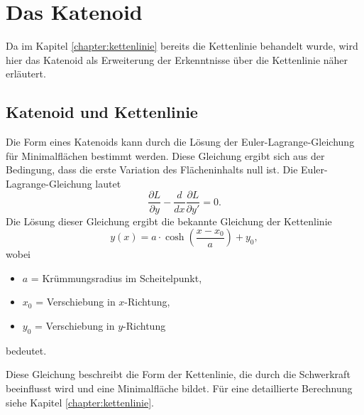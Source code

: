 %
%
%
%
\section{Das Katenoid
	\label{minimalflaechen:section:Das Katenoid}}
Da im Kapitel \ref{chapter:kettenlinie} bereits die Kettenlinie behandelt wurde, wird hier das Katenoid als Erweiterung der Erkenntnisse über die Kettenlinie näher erläutert. 

\subsection{Katenoid und Kettenlinie
	\label{Das Katenoid:subsection:Katenoid und Kettenlinie}}
Die Form eines Katenoids kann durch die Lösung der Euler-Lagrange-Gleichung für Minimalflächen bestimmt werden.
Diese Gleichung ergibt sich aus der Bedingung, dass die erste Variation des Flächeninhalts null ist.
Die Euler-Lagrange-Gleichung lautet
\begin{equation}
	\frac{\partial L}{\partial y} - \frac{d}{dx} \frac{\partial L}{\partial y'} = 0.
\end{equation}
%
Die Lösung dieser Gleichung ergibt die bekannte Gleichung der Kettenlinie
\begin{equation}
	y(x) = a \cdot \cosh \left( \frac{x - x_0}{a} \right) + y_0,
\end{equation}
%
wobei
\begin{itemize}
	\item \(a\) = Krümmungsradius im Scheitelpunkt,
	\item \(x_0\) = Verschiebung in $x$-Richtung,
	\item \(y_0\) = Verschiebung in $y$-Richtung
\end{itemize}
bedeutet.

Diese Gleichung beschreibt die Form der Kettenlinie, die durch die Schwerkraft beeinflusst wird und eine Minimalfläche bildet.
Für eine detaillierte Berechnung siehe Kapitel \ref{chapter:kettenlinie}.
